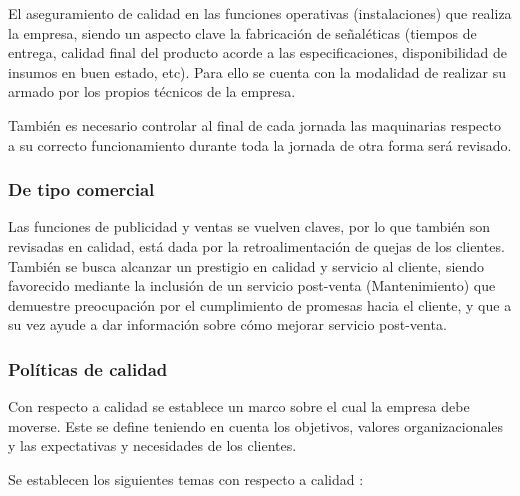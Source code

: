 			El aseguramiento de calidad en las funciones operativas (instalaciones) que realiza la empresa, siendo un aspecto clave la fabricación de señaléticas (tiempos de entrega, calidad final del producto acorde a las especificaciones, disponibilidad de insumos en buen estado, etc). Para ello se cuenta con la modalidad de realizar su armado por los propios técnicos de la empresa.
	
	
	También es necesario controlar al final de cada jornada las maquinarias respecto a su correcto funcionamiento durante toda la jornada de otra forma será revisado.
	
	
	\subsubsection{De tipo comercial}
	
	Las funciones de publicidad y ventas se vuelven claves, por lo que también son revisadas en calidad, está dada por la retroalimentación de quejas de los clientes. También se busca alcanzar un prestigio en calidad y servicio al cliente, siendo favorecido mediante la inclusión de un servicio post-venta (Mantenimiento) que demuestre preocupación por el cumplimiento de promesas hacia el cliente, y que a su vez ayude a dar información sobre cómo mejorar servicio post-venta.
	
	
	\subsubsection{Políticas de calidad}
		
		Con respecto a calidad se establece un marco sobre el cual la empresa debe moverse. Este se define teniendo en cuenta los objetivos, valores organizacionales y las expectativas y necesidades de los clientes.
		
		
		Se establecen los siguientes temas con respecto a calidad :
		
